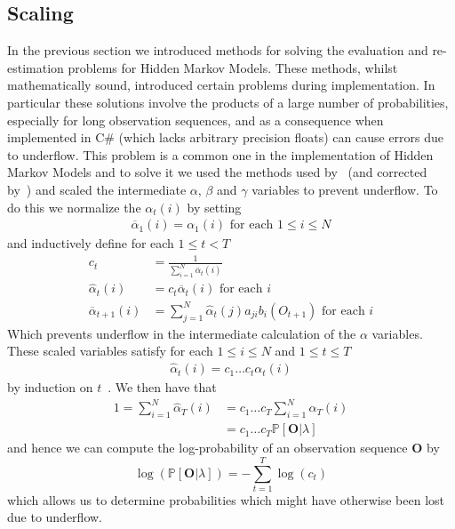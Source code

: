 \subsection{Scaling}
In the previous section we introduced methods for solving the evaluation and re-estimation problems for Hidden Markov Models. These methods, whilst mathematically sound, introduced certain problems during implementation. In particular these solutions involve the products of a large number of probabilities, especially for long observation sequences, and as a consequence when implemented in C\# (which lacks arbitrary precision floats) can cause errors due to underflow. This problem is a common one in the implementation of Hidden Markov Models and to solve it we used the methods used by~\citet{rabiner1989tutorial} (and corrected by~\cite{rahimi2000}) and scaled the intermediate $\alpha$, $\beta$ and $\gamma$ variables to prevent underflow. To do this we normalize the $\alpha_t(i)$ by setting
\begin{align*}
\overline{\alpha}_1(i) = \alpha_1(i) \text{ for each $1\leq i\leq N$} 
\end{align*}
and inductively define for each $1 \leq t < T$
\begin{align*}
c_t &= \frac{1}{\sum_{i=1}^{N}\overline{\alpha}_t(i)}\\
\hat{\alpha}_t(i) &= c_t\overline{\alpha}_t(i)\text{ for each $i$}\\
\overline{\alpha}_{t+1}(i) &= \sum_{j=1}^{N}\hat{\alpha}_t(j)a_{ji}b_i(O_{t+1}) \text{ for each $i$}
\end{align*}
Which prevents underflow in the intermediate calculation of the $\alpha$ variables. These scaled variables satisfy for each $1\leq i \leq N$ and $1 \leq t \leq T$
\begin{align*}
\hat{\alpha}_t(i) = c_1\dots c_t \alpha_t(i) 
\end{align*}
by induction on $t$~\citep{stamp2004revealing}. We then have that
\begin{align*}
1 = \sum_{i=1}^{N}\hat{\alpha}_{T}(i) &= c_1\dots c_{T}\sum_{i=1}^{N}\alpha_{T}(i)\\
&=c_1\dots c_{T}\mathbb{P}[\mathbf{O}|\lambda]
\end{align*}
and hence we can compute the log-probability of an observation sequence $\mathbf{O}$ by
\begin{equation*}
\log(\mathbb{P}[\mathbf{O}|\lambda]) = -\sum_{t=1}^{T}\log(c_t)
\end{equation*}
which allows us to determine probabilities which might have otherwise been lost due to underflow. 
